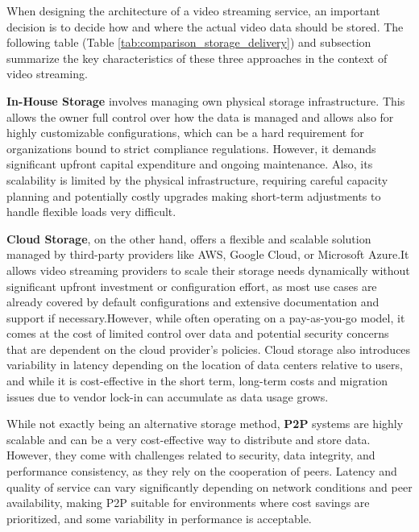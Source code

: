When designing the architecture of a video streaming service, an important decision is to decide how and where the actual video data should be stored. The following table (Table \autoref{tab:comparison_storage_delivery}) and subsection summarize the key characteristics of these three approaches in the context of video streaming. 

\textbf{In-House Storage} involves managing own physical storage infrastructure. This allows the owner full control over how the data is managed and allows also for highly customizable configurations, which can be a hard requirement for organizations bound to strict compliance regulations. However, it demands significant upfront capital expenditure and ongoing maintenance. Also, its scalability is limited by the physical infrastructure, requiring careful capacity planning and potentially costly upgrades making short-term adjustments to handle flexible loads very difficult. 

\textbf{Cloud Storage}, on the other hand, offers a flexible and scalable solution managed by third-party providers like AWS, Google Cloud, or Microsoft Azure.It allows video streaming providers to scale their storage needs dynamically without significant upfront investment or configuration effort, as most use cases are already covered by default configurations and extensive documentation and support if necessary.However, while often operating on a pay-as-you-go model, it comes at the cost of limited control over data and potential security concerns that are dependent on the cloud provider's policies. Cloud storage also introduces variability in latency depending on the location of data centers relative to users, and while it is cost-effective in the short term, long-term costs and migration issues due to vendor lock-in can accumulate as data usage grows.

While not exactly being an alternative storage method, \textbf{\ac{P2P}} systems are highly scalable and can be a very cost-effective way to distribute and store data. However, they come with challenges related to security, data integrity, and performance consistency, as they rely on the cooperation of peers. Latency and quality of service can vary significantly depending on network conditions and peer availability, making \ac{P2P} suitable for environments where cost savings are prioritized, and some variability in performance is acceptable.



